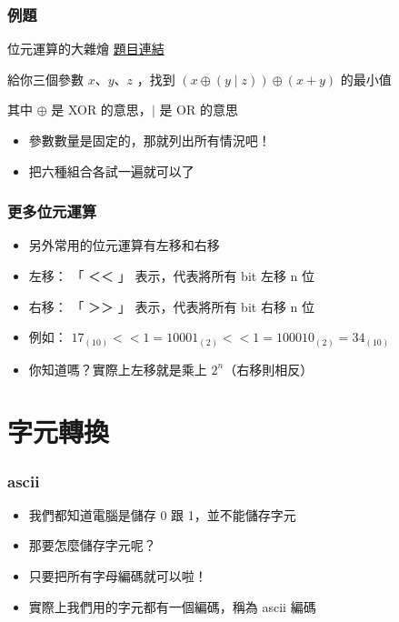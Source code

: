 \documentclass{beamer}
\begin{document}
\begin{frame}
    \frametitle{例題}
    \begin{block}{位元運算的大雜燴}
        \href{https://codeforces.com/group/S6XjkGb6qB/contest/403070/problem/B}{題目連結}

        給你三個參數 $x$、$y$、$z$ ，找到 $(x \oplus (y \mid z)) \oplus (x+y)$ 的最小值

        其中 $\oplus$ 是 XOR 的意思，$\mid$ 是 OR 的意思
    \end{block}
    \begin{itemize}
        \item<2-> 參數數量是固定的，那就列出所有情況吧！
        \item<2-> 把六種組合各試一遍就可以了
    \end{itemize}
\end{frame}

\begin{frame}
    \frametitle{更多位元運算}
    \begin{itemize}
        \item 另外常用的位元運算有左移和右移
        \vspace{0.5cm}
        \item<2-> 左移： 「 ＜＜ 」 表示，代表將所有 bit 左移 n 位
        \item<2-> 右移： 「 ＞＞ 」 表示，代表將所有 bit 右移 n 位
        \vspace{0.5cm}
        \item<3-> 例如： $17_{(10)} << 1 = 10001_{(2)} << 1 = 100010_{(2)} = 34_{(10)}$
        \item<3->你知道嗎？實際上左移就是乘上 $2^n$（右移則相反）
    \end{itemize}
\end{frame}

\section{字元轉換}

\begin{frame}
    \frametitle{ascii}
    \begin{itemize}
        \item 我們都知道電腦是儲存 0 跟 1，並不能儲存字元
        \item 那要怎麼儲存字元呢？
        \item<2-> 只要把所有字母編碼就可以啦！
        \item<2-> 實際上我們用的字元都有一個編碼，稱為 ascii 編碼
    \end{itemize}
\end{frame}
\end{document}
